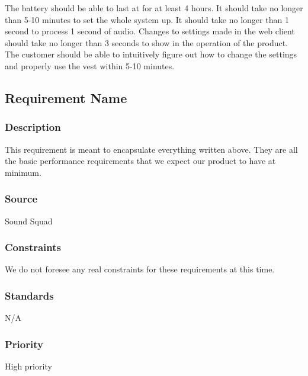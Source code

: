 The battery should be able to last at for at least 4 hours. It should take no longer than 5-10 minutes to set the whole system up. It should take no longer than 1 second to process 1 second of audio. Changes to settings made in the web client should take no longer than 3 seconds to show in the operation of the product. The customer should be able to intuitively figure out how to change the settings and properly use the vest within 5-10 minutes.

\subsection{Requirement Name}
\subsubsection{Description}
This requirement is meant to encapsulate everything written above. They are all the basic performance requirements that we expect our product to have at minimum.
\subsubsection{Source}
Sound Squad
\subsubsection{Constraints}
We do not foresee any real constraints for these requirements at this time.
\subsubsection{Standards}
N/A
\subsubsection{Priority}
High priority